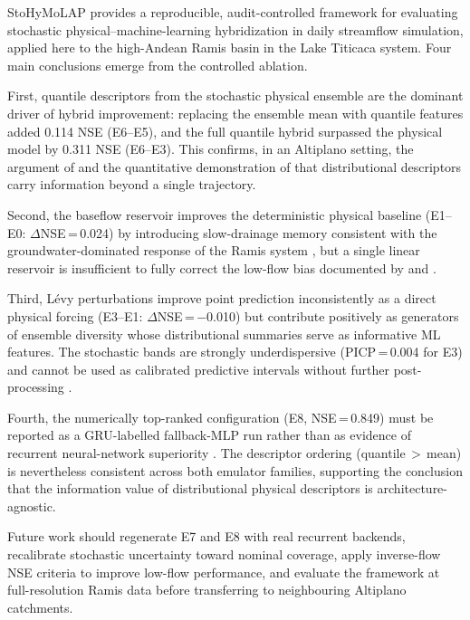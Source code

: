 \documentclass[a4paper,fleqn]{cas-sc}
\begin{document}
StoHyMoLAP provides a reproducible, audit-controlled framework for
evaluating stochastic physical--machine-learning hybridization in daily
streamflow simulation, applied here to the high-Andean Ramis basin in
the Lake Titicaca system. Four main conclusions emerge from the
controlled ablation.

First, quantile descriptors from the stochastic physical ensemble are
the dominant driver of hybrid improvement: replacing the ensemble mean
with quantile features added 0.114 NSE (E6--E5), and the full
quantile hybrid surpassed the physical model by 0.311 NSE (E6--E3).
This confirms, in an Altiplano setting, the argument of
\citet{papacharalampous2022} and the quantitative demonstration of
\citet{houenafa2025} that distributional descriptors carry information
beyond a single trajectory.

Second, the baseflow reservoir improves the deterministic physical
baseline (E1--E0: $\Delta$NSE\,=\,0.024) by introducing slow-drainage
memory consistent with the groundwater-dominated response of the Ramis
system \citep{nauditt2017}, but a single linear reservoir is
insufficient to fully correct the low-flow bias documented by
\citet{pushpalatha2012} and \citet{van2013}.

Third, L\'{e}vy perturbations improve point prediction inconsistently
as a direct physical forcing (E3--E1: $\Delta$NSE\,=\,$-$0.010) but
contribute positively as generators of ensemble diversity whose
distributional summaries serve as informative ML features. The
stochastic bands are strongly underdispersive (PICP\,=\,0.004 for E3)
and cannot be used as calibrated predictive intervals without further
post-processing \citep{thiboult2016,crochemore2016}.

Fourth, the numerically top-ranked configuration (E8, NSE\,=\,0.849)
must be reported as a GRU-labelled fallback-MLP run rather than as
evidence of recurrent neural-network superiority \citep{hall2021}.
The descriptor ordering (quantile\,$>$\,mean) is nevertheless
consistent across both emulator families, supporting the conclusion
that the information value of distributional physical descriptors is
architecture-agnostic.

Future work should regenerate E7 and E8 with real recurrent backends,
recalibrate stochastic uncertainty toward nominal coverage, apply
inverse-flow NSE criteria to improve low-flow performance, and
evaluate the framework at full-resolution Ramis data before
transferring to neighbouring Altiplano catchments.
\end{document}
